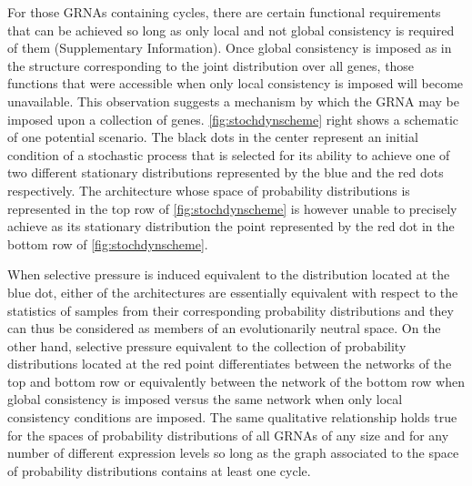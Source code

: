 For those GRNAs containing cycles, there are certain functional requirements that can be achieved so long as only local and not global consistency is required of them (Supplementary Information). Once global consistency is imposed as in the structure corresponding to the joint distribution over all genes, those functions that were accessible when only local consistency is imposed will become unavailable. This observation suggests a mechanism by which the GRNA may be imposed upon a collection of genes. \ref{fig:stochdynscheme} right shows a schematic of one potential scenario. The black dots in the center represent an initial condition of a stochastic process that is selected for its ability to achieve one of two different stationary distributions represented by the blue and the red dots respectively. The architecture whose space of probability distributions is represented in the top row of \ref{fig:stochdynscheme} is however unable to precisely achieve as its stationary distribution the point represented by the red dot in the bottom row of \ref{fig:stochdynscheme}.

When selective pressure is induced equivalent to the distribution located at the blue dot, either of the architectures are essentially equivalent with respect to the statistics of samples from their corresponding probability distributions and they can thus be considered as members of an evolutionarily neutral space. On the other hand, selective pressure equivalent to the collection of probability distributions located at the red point differentiates between the networks of the top and bottom row or equivalently between the network of the bottom row when global consistency is imposed versus the same network when only local consistency conditions are imposed. The same qualitative relationship holds true for the spaces of probability distributions of all GRNAs of any size and for any number of different expression levels so long as the graph associated to the space of probability distributions contains at least one cycle.
